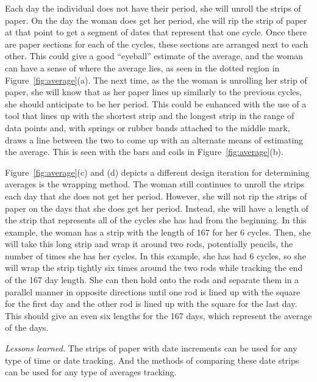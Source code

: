 \documentclass{sig-alternate}
\begin{document}
Each day the individual does not have their period, she will unroll the strips of paper. 
On the day the woman does get her period, she will rip the strip of paper at that point to get a segment of dates that represent that one cycle. Once there are paper sections for each of the cycles, these sections are arranged next to each other. This could give a good ``eyeball'' estimate of the average, and the woman can have a sense of where the average lies, as seen in the dotted region in Figure~\ref{fig:average}(a). The next time, as the the woman is unrolling her strip of paper, she will know that as her paper lines up similarly to the previous cycles, she should anticipate to be her period. This could be enhanced with the use of a tool that lines up with the shortest strip and the longest strip in the range of data points and, with springs or rubber bands attached to the middle mark, draws a line between the two to come up with an alternate means of estimating the average. This is seen with the bars and coils in Figure~\ref{fig:average}(b).

Figure~\ref{fig:average}(c) and (d) depicts a different design iteration for determining averages is the wrapping method. The woman still continues to unroll the strips each day that she does not get her period. However, she will not rip the strips of paper on the days that she does get her period. Instead, she will have a length of the strip that represents all of the cycles she has had from the beginning. In this example, the woman has a strip with the length of 167 for her 6 cycles. Then, she will take this long strip and wrap it around two rods, potentially pencils, the number of times she has her cycles. In this example, she has had 6 cycles, so she will wrap the strip tightly six times around the two rods while tracking the end of the 167 day length. She can then hold onto the rods and separate them in a parallel manner in opposite directions until one rod is lined up with the square for the first day and the other rod is lined up with the square for the last day. This should give an even six lengths for the 167 days, which represent the average of the days.

\emph{Lessons learned.}
The strips of paper with date increments can be used for any type of time or date tracking. And the methods of comparing these date strips can be used for any type of averages tracking. 
\end{document}
